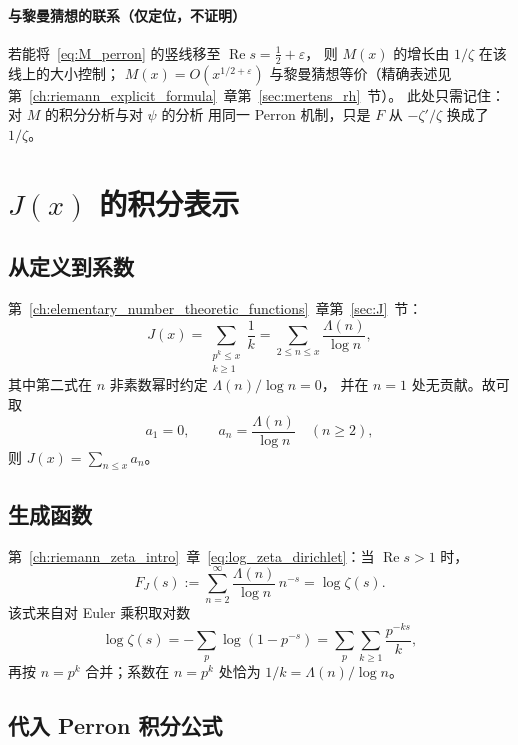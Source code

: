 \paragraph{与黎曼猜想的联系（仅定位，不证明）}
若能将~\eqref{eq:M_perron} 的竖线移至 $\operatorname{Re}s=\tfrac12+\varepsilon$，
则 $M(x)$ 的增长由 $1/\zeta$ 在该线上的大小控制；
$M(x)=O(x^{1/2+\varepsilon})$ 与黎曼猜想等价（精确表述见
第~\ref{ch:riemann_explicit_formula}~章第~\ref{sec:mertens_rh}~节）。
此处只需记住：对 $M$ 的积分分析与对 $\psi$ 的分析
用同一 Perron 机制，只是 $F$ 从 $-\zeta'/\zeta$ 换成了 $1/\zeta$。


\section{\texorpdfstring{$J(x)$}{J(x)} 的积分表示}
\label{sec:J_integral}

\subsection{从定义到系数}

第~\ref{ch:elementary_number_theoretic_functions}~章第~\ref{sec:J}~节：
\begin{equation}
  J(x)
  =\sum_{\substack{p^k\le x\\ k\ge 1}}\frac{1}{k}
  =\sum_{2\le n\le x}\frac{\Lambda(n)}{\log n},
  \label{eq:J_def_ch6}
\end{equation}
其中第二式在 $n$ 非素数幂时约定 $\Lambda(n)/\log n=0$，
并在 $n=1$ 处无贡献。故可取
\[
  a_1=0,\qquad
  a_n=\frac{\Lambda(n)}{\log n}\quad(n\ge 2),
\]
则 $J(x)=\sum_{n\le x}a_n$。

\subsection{生成函数}

第~\ref{ch:riemann_zeta_intro}~章~\eqref{eq:log_zeta_dirichlet}：当 $\operatorname{Re}s>1$ 时，
\begin{equation}
  F_{J}(s)
  :=\sum_{n=2}^{\infty}\frac{\Lambda(n)}{\log n}\,n^{-s}
  =\log\zeta(s).
  \label{eq:F_J_ch6}
\end{equation}
该式来自对 Euler 乘积取对数
\[
  \log\zeta(s)=-\sum_{p}\log(1-p^{-s})=\sum_{p}\sum_{k\ge 1}\frac{p^{-ks}}{k},
\]
再按 $n=p^k$ 合并；系数在 $n=p^k$ 处恰为 $1/k=\Lambda(n)/\log n$。

\subsection{代入 Perron 积分公式}

